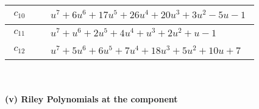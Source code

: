 \documentclass[1p]{elsarticle_modified}
\theoremstyle{definition}
\begin{document}
\begin{tabular}{m{50pt}|m{274pt}}
\hline $$\begin{aligned}c_{10}\end{aligned}$$&$\begin{aligned}
&u^7+6 u^6+17 u^5+26 u^4+20 u^3+3 u^2-5 u-1
\end{aligned}$\\
\hline $$\begin{aligned}c_{11}\end{aligned}$$&$\begin{aligned}
&u^7+u^6+2 u^5+4 u^4+u^3+2 u^2+u-1
\end{aligned}$\\
\hline $$\begin{aligned}c_{12}\end{aligned}$$&$\begin{aligned}
&u^7+5 u^6+6 u^5+7 u^4+18 u^3+5 u^2+10 u+7
\end{aligned}$\\
\hline
\end{tabular}\\~\\
\newpage\renewcommand{\arraystretch}{1}
\flushleft \textbf{(v) Riley Polynomials at the component}\newline \\
\end{document}
